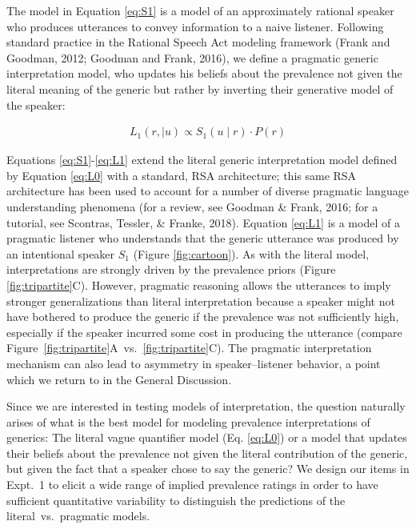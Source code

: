 \documentclass[floatsintext,doc]{apa6}
\begin{document}
The model in Equation \ref{eq:S1} is a model of an approximately rational speaker who produces utterances to convey information to a naive listener. 
Following standard practice in the Rational Speech Act modeling framework (Frank and Goodman, 2012; Goodman and Frank, 2016), we define a pragmatic generic interpretation model, who updates his beliefs about the prevalence not given the literal meaning of the generic but rather by inverting their generative model of the speaker:

\begin{eqnarray}
L_1(r, \mid u) \propto S_1(u \mid r) \cdot P(r) \label{eq:L1}
\end{eqnarray}

Equations \ref{eq:S1}-\ref{eq:L1} extend the literal generic interpretation model defined by Equation \ref{eq:L0} with a standard, RSA architecture; this same RSA architecture has been used to account for a number of diverse pragmatic language understanding phenomena (for a review, see Goodman \& Frank, 2016; for a tutorial, see Scontras, Tessler, \& Franke, 2018).
Equation \ref{eq:L1} is a model of a pragmatic listener who understands that the generic utterance was produced by an intentional speaker \(S_1\) (Figure \ref{fig:cartoon}).
As with the literal model, interpretations are strongly driven by the prevalence priors (Figure \ref{fig:tripartite}C). 
However, pragmatic reasoning allows the utterances to imply stronger generalizations than literal interpretation because a speaker might not have bothered to produce the generic if the prevalence was not sufficiently high, especially if the speaker incurred some cost in producing the utterance (compare Figure~\ref{fig:tripartite}A~vs.~\ref{fig:tripartite}C).
The pragmatic interpretation mechanism can also lead to asymmetry in speaker--listener behavior, a point which we return to in the General Discussion. 






Since we are interested in testing models of interpretation, the question naturally arises of what is the best model for modeling prevalence interpretations of generics: The literal vague quantifier model (Eq. \ref{eq:L0}) or a model that updates their beliefs about the prevalence not given the literal contribution of the generic, but given the fact that a speaker chose to say the generic?
We design our items in Expt.~1 to elicit a wide range of implied prevalence ratings in order to have sufficient quantitative variability to distinguish the predictions of the literal~vs.~pragmatic models.
\end{document}
